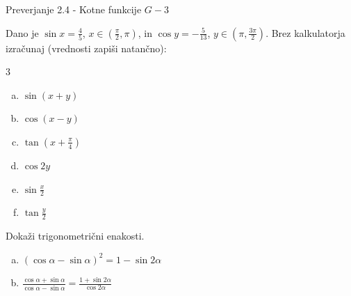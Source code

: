 \documentclass[a4paper,12pt]{letter}
\newcommand{\ds}{\displaystyle}
\renewcommand{\headrulewidth}{3pt}
\renewcommand{\headrulewidth}{0.3pt}
\newcounter{tocke}
\begin{document}
\pagestyle{fancy}
\renewcommand\headrulewidth{0pt}
\lhead{}\chead{}\rhead{}
\rfoot{\vspace*{-2\baselineskip}}
\renewcommand{\vec}{\overrightarrow}
\def\programletnik{G-3}
\def\naslov{Preverjanje 2.4 - }
\def\sklop{Kotne funkcije}
\def\tockeA{1+1+1+1+1+1}
\def\tockeB{2+3}
\def\tockeC{2+3}
\def\tockeD{3+3}
\def\tockeE{3}
\def\tockeF{3+3}
\begin{minipage}{20cm}
\begin{bclogo}[couleur=brown!30,
  arrondi=0,ombre=true, couleurOmbre=gray!50,
logo =\bcplume,
  noborder=true]
{\textrm{{\Large{\naslov \sklop} \Huge{}
\large{} \hfill $\programletnik$}}}
\end{bclogo}
\end{minipage}
\begin{minipage}{20cm}
\begin{bclogo}[couleur=brown!30,
  arrondi=0,ombre=true, couleurOmbre=gray!50,
logo =\bcplume,
  noborder=true]
{\textrm{{}}}
\end{bclogo}
\end{minipage}

\begin{naloga}[\hfill $\tockeA$] \addtocounter{tocke}{\numexpr\tockeA\relax}
Dano je $\sin x=\frac45$, $x\in\left(\frac{\pi}{2},\pi\right)$, in $\cos y=-\frac{5}{13}$, $y\in\left(\pi,\frac{3\pi}{2}\right)$. Brez kalkulatorja izra\v{c}unaj (vrednosti zapi\v{s}i natan\v{c}no):
\begin{multicols}{3}
\begin{enumerate}[a)]
\item $\ds\sin(x+y)$
\item $\ds\cos(x-y)$
\item $\ds\tan\left(x+\frac{\pi}{4}\right)$
\item $\ds\cos2y$
\item $\ds\sin\frac{x}{2}$
\item $\ds\tan\frac{y}{2}$
\end{enumerate}
\end{multicols}
\end{naloga}\newpage

\begin{naloga}[\hfill $\tockeB$] \addtocounter{tocke}{\numexpr\tockeB\relax}
Doka\v{z}i trigonometri\v{c}ni enakosti.
\begin{enumerate}[a)]
\item $\ds(\cos\alpha-\sin\alpha)^2=1-\sin2\alpha$
\item $\ds\frac{\cos\alpha+\sin\alpha}{\cos\alpha-\sin\alpha}=\frac{1+\sin2\alpha}{\cos2\alpha}$
\end{enumerate}
\end{naloga}\newpage
\end{document}
